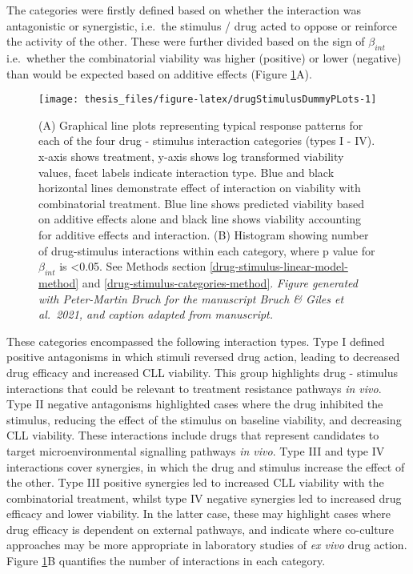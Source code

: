 \documentclass[11pt, a4paper, twosided]{book}
\begin{document}
The categories were firstly defined based on whether the interaction was antagonistic or synergistic, i.e.~the stimulus / drug acted to oppose or reinforce the activity of the other. These were further divided based on the sign of \(\beta_{int}\) i.e.~whether the combinatorial viability was higher (positive) or lower (negative) than would be expected based on additive effects (Figure \ref{fig:drugStimulusDummyPLots}A).


\begin{figure}

{\centering \texttt{[image: thesis\_files/figure-latex/drugStimulusDummyPLots-1]} 

}

\caption{(A) Graphical line plots representing typical response patterns for each of the four drug - stimulus interaction categories (types I - IV). x-axis shows treatment, y-axis shows log transformed viability values, facet labels indicate interaction type. Blue and black horizontal lines demonstrate effect of interaction on viability with combinatorial treatment. Blue line shows predicted viability based on additive effects alone and black line shows viability accounting for additive effects and interaction. (B) Histogram showing number of drug-stimulus interactions within each category, where p value for \(\beta_{int}\) is \textless0.05. See Methods section \ref{drug-stimulus-linear-model-method} and \ref{drug-stimulus-categories-method}. \emph{Figure generated with Peter-Martin Bruch for the manuscript Bruch \& Giles et al.~2021, and caption adapted from manuscript.}}\label{fig:drugStimulusDummyPLots}
\end{figure}
These categories encompassed the following interaction types. Type I defined positive antagonisms in which stimuli reversed drug action, leading to decreased drug efficacy and increased CLL viability. This group highlights drug - stimulus interactions that could be relevant to treatment resistance pathways \emph{in vivo}. Type II negative antagonisms highlighted cases where the drug inhibited the stimulus, reducing the effect of the stimulus on baseline viability, and decreasing CLL viability. These interactions include drugs that represent candidates to target microenvironmental signalling pathways \emph{in vivo}. Type III and type IV interactions cover synergies, in which the drug and stimulus increase the effect of the other. Type III positive synergies led to increased CLL viability with the combinatorial treatment, whilst type IV negative synergies led to increased drug efficacy and lower viability. In the latter case, these may highlight cases where drug efficacy is dependent on external pathways, and indicate where co-culture approaches may be more appropriate in laboratory studies of \emph{ex vivo} drug action. Figure \ref{fig:drugStimulusDummyPLots}B quantifies the number of interactions in each category.
\end{document}
